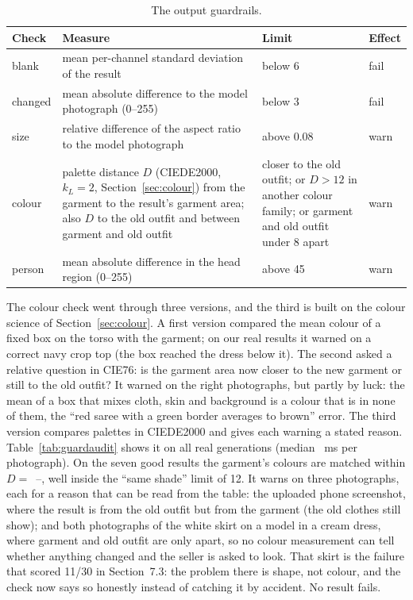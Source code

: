 \begin{table}[!htbp]
\centering
\caption{The output guardrails.}
\label{tab:guardchecks}
\small
\begin{tabularx}{\linewidth}{@{}L{17mm}YL{37mm}L{11mm}@{}}
\toprule
\textbf{Check} & \textbf{Measure} & \textbf{Limit} & \textbf{Effect}\\
\midrule
blank & mean per-channel standard deviation of the result & below 6 & fail\\
changed & mean absolute difference to the model photograph (0--255) & below 3 & fail\\
size & relative difference of the aspect ratio to the model photograph & above 0.08 & warn\\
colour & palette distance $D$ (CIEDE2000, $k_L = 2$, Section~\ref{sec:colour}) from the garment to the result's garment area; also $D$ to the old outfit and between garment and old outfit & closer to the old outfit; or $D > 12$ in another colour family; or garment and old outfit under 8 apart & warn\\
person & mean absolute difference in the head region (0--255) & above 45 & warn\\
\bottomrule
\end{tabularx}
\end{table}

The colour check went through three versions, and the third is built on the colour science of Section~\ref{sec:colour}. A first version compared the mean colour of a fixed box on the torso with the garment; on our real results it warned on a correct navy crop top (the box reached the dress below it). The second asked a relative question in CIE76: is the garment area now closer to the new garment or still to the old outfit? It warned on the right photographs, but partly by luck: the mean of a box that mixes cloth, skin and background is a colour that is in none of them, the ``red saree with a green border averages to brown'' error. The third version compares palettes in CIEDE2000 and gives each warning a stated reason. \ifAppGuard Table~\ref{tab:guardaudit} shows it on all \vAgN{} real generations (median \vAgMs{}~ms per photograph). On the seven good results the garment's colours are matched within $D = $~\vAgGoodMin{}--\vAgGoodMax{}, well inside the ``same shade'' limit of 12. It warns on three photographs, each for a reason that can be read from the table: the uploaded phone screenshot, where the result is \vAgShotOld{} from the old outfit but \vAgShotNew{} from the garment (the old clothes still show); and both photographs of the white skirt on a model in a cream dress, where garment and old outfit are only \vAgSkirtAlike{} apart, so no colour measurement can tell whether anything changed and the seller is asked to look. That skirt is the failure that scored 11/30 in Section~7.3: the problem there is shape, not colour, and the check now says so honestly instead of catching it by accident. No result fails.


